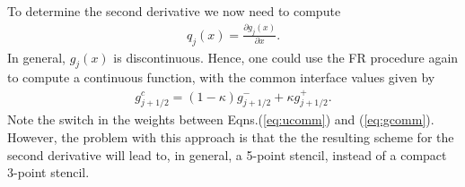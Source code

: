 \documentclass[11pt, reqno]{amsart}
\theoremstyle{definition}
\begin{document}
To determine the second derivative we now need to compute
\begin{align}
  q_j(x) = \frac{\partial g_j(x)}{\partial x}.
\end{align}
In general, $g_j(x)$ is discontinuous. Hence, one could use the FR
procedure again to compute a continuous function, with the common
interface values given by
\begin{align}\label{eq:gcomm}
  g_{j+1/2}^c = (1-\kappa) g_{j+1/2}^-
  +
  \kappa g_{j+1/2}^+.
\end{align}
Note the switch in the weights between Eqns.\thinspace(\ref{eq:ucomm})
and (\ref{eq:gcomm}). However, the problem with this approach is that
the the resulting scheme for the second derivative will lead to, in
general, a 5-point stencil, instead of a compact 3-point stencil.
\end{document}
